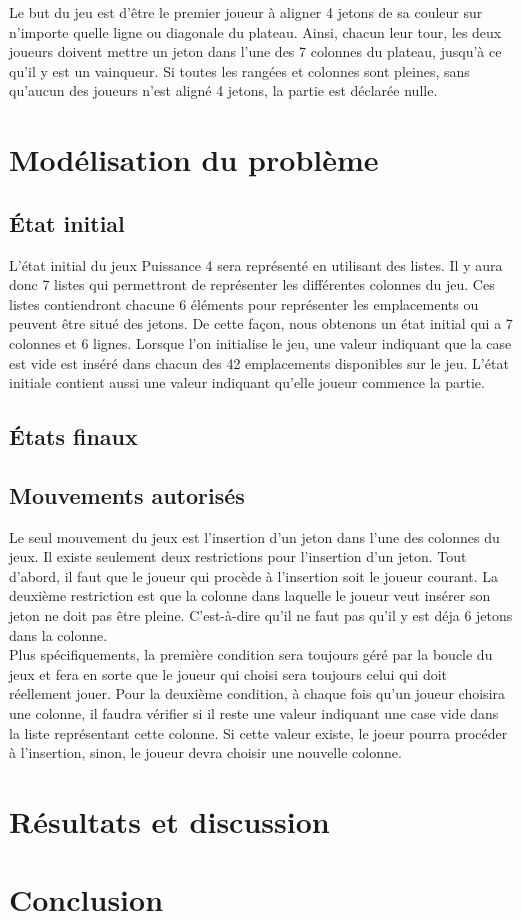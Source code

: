\documentclass[12pt]{article}
\begin{document}
Le but du jeu est d'être le premier joueur à aligner 4 jetons de sa couleur sur n'importe quelle ligne ou diagonale du plateau. Ainsi, chacun leur tour, les deux joueurs doivent mettre un jeton dans l'une des 7 colonnes du plateau, jusqu'à ce qu'il y est un vainqueur. Si toutes les rangées et colonnes sont pleines, sans qu'aucun des joueurs n'est aligné 4 jetons, la partie est déclarée nulle.

\section*{Modélisation du problème}

\subsection*{État initial}
L'état initial du jeux Puissance 4 sera représenté en utilisant des listes. Il y aura donc 7 listes qui permettront de représenter les différentes colonnes du jeu. Ces listes contiendront chacune 6 éléments pour représenter les emplacements ou peuvent être situé des jetons. De cette façon, nous obtenons un état initial qui a 7 colonnes et 6 lignes. Lorsque l’on initialise le jeu, une valeur indiquant que la case est vide est inséré dans chacun des 42 emplacements disponibles sur le jeu. L’état initiale contient aussi une valeur indiquant qu’elle joueur commence la partie.

\subsection*{États finaux}

\subsection*{Mouvements autorisés}
Le seul mouvement du jeux est l'insertion d'un jeton dans l'une des colonnes du jeux. Il existe seulement deux restrictions pour l'insertion d'un jeton. Tout d'abord, il faut que le joueur qui procède à l'insertion soit le joueur courant. La deuxième restriction est que la colonne dans laquelle le joueur veut insérer son jeton ne doit pas être pleine. C'est-à-dire qu'il ne faut pas qu'il y est déja 6 jetons dans la colonne. \\

Plus spécifiquements, la première condition sera toujours géré par la boucle du jeux  et fera en sorte que le joueur qui choisi sera toujours celui qui doit réellement jouer. Pour la deuxième condition, à chaque fois qu'un joueur choisira une colonne, il faudra vérifier si il reste une valeur indiquant une case vide dans la liste représentant cette colonne. Si cette valeur existe, le joeur pourra procéder à l'insertion, sinon, le joueur devra choisir une nouvelle colonne. 

\section*{Résultats et discussion}

\section*{Conclusion}
\end{document}
